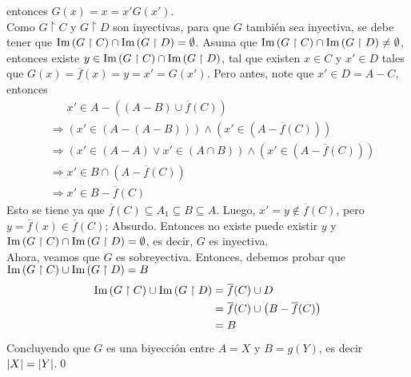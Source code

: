     entonces \(G(x) = x = x' G(x')\). \\
    Como \(G \upharpoonright C\) y \(G \upharpoonright D\) son inyectivas, para que \(G\) también sea inyectiva, 
    se debe tener que \(\text{Im}\left( G \upharpoonright C \right) \cap \text{Im}\left( G \upharpoonright D \right) = \emptyset\). Asuma que \(\text{Im}\left( G \upharpoonright C \right) \cap \text{Im}\left( G \upharpoonright D \right) \neq \emptyset\),
    entonces existe \(y \in \text{Im}\left( G \upharpoonright C \right) \cap \text{Im}\left( G \upharpoonright D \right)\), 
    tal que existen \(x \in C\) y \(x' \in D\) tales que \(G(x) = \overline{f}(x) = y = x' = G(x')\).
    Pero antes, note que \(x' \in D = A - C\), entonces 
    \[
        \begin{aligned}
            &\phantom{\Rightarrow} x' \in A - \left((A - B) \cup \overline{f}(C)\right) \\
            &\Rightarrow \left(x' \in \left(A - (A - B)\right)\right) \wedge \left(x' \in \left(A - \overline{f}(C)\right)\right) \\
            &\Rightarrow \left(x' \in (A - A) \vee x' \in (A \cap B)\right) \wedge \left(x' \in \left(A - \overline{f}(C)\right)\right) \\
            &\Rightarrow x' \in B \cap (A - \overline{f}(C)) \\
            &\Rightarrow x' \in B - \overline{f}(C)
        \end{aligned}
    \]
    Esto se tiene ya que \(\overline{f}(C) \subseteq A_1 \subseteq B \subseteq A\).
    Luego, \(x' = y \not\in \overline{f}(C)\), pero \(y = \overline{f}(x) \in \overline{f}(C)\); Absurdo. 
    Entonces no existe puede existir \(y\) y \(\text{Im}\left( G \upharpoonright C \right) \cap \text{Im}\left( G \upharpoonright D \right) = \emptyset\), es decir, \(G\) es inyectiva. \\
    Ahora, veamos que \(G\) es sobreyectiva. Entonces, debemos probar que \(\text{Im}\left( G \upharpoonright C \right) \cup \text{Im}\left( G \upharpoonright D \right) = B\)
    \[
        \begin{aligned}
            \text{Im}\left( G \upharpoonright C \right) \cup \text{Im}\left( G \upharpoonright D \right)
                &= \overline{f}(C) \cup D \\
                &= \overline{f}(C) \cup \left(B - \overline{f}(C)\right) \\
                &= B
        \end{aligned}
    \]
    Concluyendo que \(G\) es una biyección entre \(A = X\) y \(B = g(Y)\), es decir \(\left|X\right| = \left|Y\right|\).\qed{}
